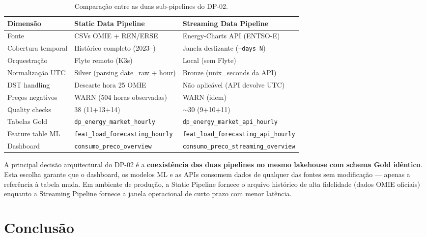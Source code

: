 \documentclass[11pt,a4paper]{article}
\begin{document}
\begin{table}[h!]
\centering
\small
\begin{tabularx}{\linewidth}{lXX}
\toprule
\textbf{Dimensão} & \textbf{Static Data Pipeline} & \textbf{Streaming Data Pipeline} \\
\midrule
Fonte & CSVs OMIE + REN/ERSE & Energy-Charts API (ENTSO-E) \\
Cobertura temporal & Histórico completo (2023--) & Janela deslizante (\texttt{--days N}) \\
Orquestração & Flyte remoto (K3s) & Local (sem Flyte) \\
Normalização UTC & Silver (parsing date\_raw + hour) & Bronze (unix\_seconds da API) \\
DST handling & Descarte hora 25 OMIE & Não aplicável (API devolve UTC) \\
Preços negativos & WARN (504 horas observadas) & WARN (idem) \\
Quality checks & 38 (11+13+14) & $\sim$30 (9+10+11) \\
Tabelas Gold & \texttt{dp\_energy\_market\_hourly} & \texttt{dp\_energy\_market\_api\_hourly} \\
Feature table ML & \texttt{feat\_load\_forecasting\_hourly} & \texttt{feat\_load\_forecasting\_api\_hourly} \\
Dashboard & \texttt{consumo\_preco\_overview} & \texttt{consumo\_preco\_streaming\_overview} \\
\bottomrule
\end{tabularx}
\caption{Comparação entre as duas sub-pipelines do DP-02.}
\end{table}

A principal decisão arquitectural do DP-02 é a \textbf{coexistência das duas pipelines no mesmo lakehouse com schema Gold idêntico}. Esta escolha garante que o dashboard, os modelos ML e as APIs consomem dados de qualquer das fontes sem modificação --- apenas a referência à tabela muda. Em ambiente de produção, a Static Pipeline fornece o arquivo histórico de alta fidelidade (dados OMIE oficiais) enquanto a Streaming Pipeline fornece a janela operacional de curto prazo com menor latência.

\section{Conclusão}
\end{document}
